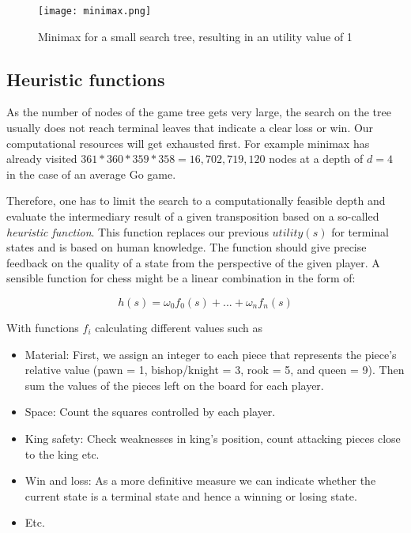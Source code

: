 \begin{figure}
    \centering
    \texttt{[image: minimax.png]}
    \caption{Minimax for a small search tree, resulting in an utility value of 1}
    \label{minimax}
\end{figure}

\subsection{Heuristic functions}
As the number of nodes of the game tree gets very large, the search on the tree usually does not reach terminal leaves that indicate a clear loss or win. Our computational resources will get exhausted first. For example minimax has already visited $ 361 * 360 * 359 * 358 = 16,702,719,120 $ nodes at a depth of $ d = 4 $ in the case of an average Go game.

Therefore, one has to limit the search to a computationally feasible depth and evaluate the intermediary result of a given transposition based on a so-called \textit{heuristic function}. This function replaces our previous $ utility(s) $ for terminal states and is based on human knowledge. The function should give precise feedback on the quality of a state from the perspective of the given player. A sensible function for chess might be a linear combination in the form of:

\begin{equation}
    h(s) = \omega_0f_0(s) + ... + \omega_nf_n(s)
\end{equation}

With functions $ f_i $ calculating different values such as

\begin{itemize}
    \item Material: First, we assign an integer to each piece that represents the piece's relative value (pawn = 1, bishop/knight = 3, rook = 5, and queen = 9). Then sum the values of the pieces left on the board for each player.
    \item Space: Count the squares controlled by each player.
    \item King safety: Check weaknesses in king's position, count attacking pieces close to the king etc.
    \item Win and loss: As a more definitive measure we can indicate whether the current state is a terminal state and hence a winning or losing state.
    \item Etc.
\end{itemize}

